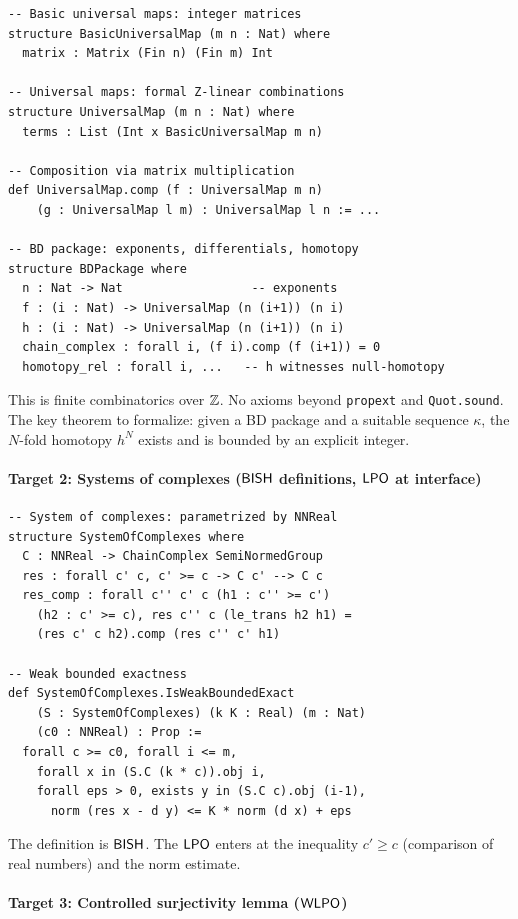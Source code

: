 \begin{verbatim}
-- Basic universal maps: integer matrices
structure BasicUniversalMap (m n : Nat) where
  matrix : Matrix (Fin n) (Fin m) Int

-- Universal maps: formal Z-linear combinations
structure UniversalMap (m n : Nat) where
  terms : List (Int x BasicUniversalMap m n)

-- Composition via matrix multiplication
def UniversalMap.comp (f : UniversalMap m n)
    (g : UniversalMap l m) : UniversalMap l n := ...

-- BD package: exponents, differentials, homotopy
structure BDPackage where
  n : Nat -> Nat                  -- exponents
  f : (i : Nat) -> UniversalMap (n (i+1)) (n i)
  h : (i : Nat) -> UniversalMap (n (i+1)) (n i)
  chain_complex : forall i, (f i).comp (f (i+1)) = 0
  homotopy_rel : forall i, ...   -- h witnesses null-homotopy
\end{verbatim}

This is finite combinatorics over $\mathbb{Z}$.  No axioms beyond
\texttt{propext} and \texttt{Quot.sound}.  The key theorem to
formalize: given a BD package and a suitable sequence $\kappa$,
the $N$-fold homotopy $h^N$ exists and is bounded by an explicit
integer.

\paragraph{Target 2: Systems of complexes ($\textsf{BISH}$ definitions, $\textsf{LPO}$ at interface)}

\begin{verbatim}
-- System of complexes: parametrized by NNReal
structure SystemOfComplexes where
  C : NNReal -> ChainComplex SemiNormedGroup
  res : forall c' c, c' >= c -> C c' --> C c
  res_comp : forall c'' c' c (h1 : c'' >= c')
    (h2 : c' >= c), res c'' c (le_trans h2 h1) =
    (res c' c h2).comp (res c'' c' h1)

-- Weak bounded exactness
def SystemOfComplexes.IsWeakBoundedExact
    (S : SystemOfComplexes) (k K : Real) (m : Nat)
    (c0 : NNReal) : Prop :=
  forall c >= c0, forall i <= m,
    forall x in (S.C (k * c)).obj i,
    forall eps > 0, exists y in (S.C c).obj (i-1),
      norm (res x - d y) <= K * norm (d x) + eps
\end{verbatim}

The definition is $\textsf{BISH}$.  The $\textsf{LPO}$ enters at the inequality
$c' \geq c$ (comparison of real numbers) and the norm estimate.

\paragraph{Target 3: Controlled surjectivity lemma ($\textsf{WLPO}$)}

